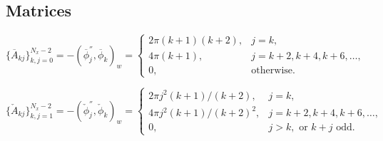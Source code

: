 \documentclass[11pt, oneside]{article}
\newcommand{\N}[1]{\check{#1}}
\newcommand{\D}[1]{\overline{#1}}
\begin{document}
%
%        
%
%
%
%        
%        
%    
%
\subsection*{Matrices}


\begin{equation}
 \{\D{A}_{kj}\}_{k,j=0}^{N_x-2} = -\left(\D{\phi}^{''}_{j}, \D{\phi}_{k} \right)_w = \begin{cases}
 2\pi(k+1)(k+2), &j=k,\\
 4\pi(k+1), & j=k+2, k+4, k+6, \ldots, \\
 0, &\text{otherwise}.
 \end{cases}
\end{equation}

\begin{equation}
 \{\N{A}_{kj}\}_{k,j=1}^{N_x-2} = -\left(\N{\phi}^{''}_{j}, \N{\phi}_{k} \right)_w = \begin{cases}
 2\pi j^2(k+1)/(k+2), &j=k,\\
 4\pi j^2(k+1)/(k+2)^2, & j=k+2, k+4, k+6, \ldots, \\
 0, &j>k, \text{ or } k+j \text{ odd}.
 \end{cases}
\end{equation}
\end{document}
